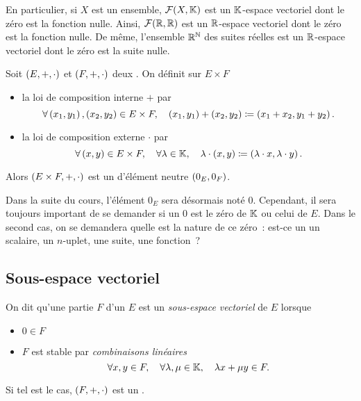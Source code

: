 \documentclass{magnoliaold}
\begin{document}
\begin{remarqueUnique}
\remarque En particulier, si $X$ est un ensemble, $\mathcal{F}(X,\mathbb{K})$ est un
  $\mathbb{K}$-espace vectoriel dont le \og zéro \fg est la fonction nulle. Ainsi,
  $\mathcal{F}(\mathbb{R},\mathbb{R})$ est un $\mathbb{R}$-espace vectoriel dont le \og zéro \fg est
  la fonction nulle. De même, l'ensemble $\mathbb{R}^{\mathbb{N}}$ des suites réelles est un
  $\mathbb{R}$-espace vectoriel dont le \og zéro \fg est la suite nulle.
\end{remarqueUnique}

\begin{definition}[utile=-2]
Soit $\left(E,+,\cdot\right)$ et $\left(F,+,\cdot\right)$ deux \Kevs. On définit sur $E\times F$
\begin{itemize}
\item la loi de composition interne $+$ par
  \[\forall \left(x_1,y_1\right),\left(x_2,y_2\right)\in E\times F ,\quad
    \left(x_1,y_1\right)+\left(x_2,y_2\right)\coloneqq\left(x_1+x_2,y_1+y_2\right).\]
\item la loi de composition externe $\cdot$ par
  \[\forall \left(x,y\right)\in E\times F ,\quad \forall \lambda\in\mathbb{K} ,\quad
    \lambda\cdot\left(x,y\right)\coloneqq\left(\lambda\cdot x,\lambda\cdot y\right).\]
\end{itemize}
Alors $\left(E\times F,+,\cdot\right)$ est un \Kev d'élément neutre $\left(0_E,0_F\right)$.
\end{definition}






Dans la suite du cours, l'élément $0_E$ sera désormais noté $0$. Cependant, il sera
toujours important de se demander si un $0$ est le zéro de $\mathbb{K}$ ou celui de $E$. Dans
le second cas, on se demandera quelle est la nature de ce zéro~:
est-ce un un scalaire, un $n$-uplet, une suite, une fonction~?

\subsection{Sous-espace vectoriel}

\begin{definition}[utile=-3]
On dit qu'une partie $F$ d'un \Kev $E$ est un \emph{sous-espace vectoriel} de $E$
lorsque
\begin{itemize}
\item $0\in F$
\item $F$ est stable par \emph{combinaisons linéaires}
  \[\forall x,y\in F ,\quad \forall \lambda,\mu\in\mathbb{K} ,\quad
    \lambda x+\mu y\in F.\]
\end{itemize}
Si tel est le cas, $\left(F,+,\cdot\right)$ est un \Kev.
\end{definition}
\end{document}

